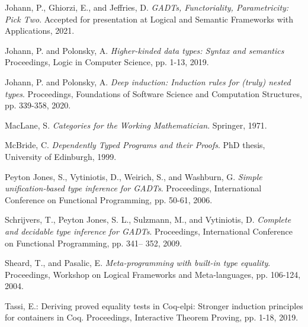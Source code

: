 \documentclass[9pt]{entcs}
\begin{document}
\begin{thebibliography}{10}
 Johann, P., Ghiorzi, E., and Jeffries, D. {\em GADTs,
  Functoriality, Parametricity: Pick Two}. Accepted for presentation
  at Logical and Semantic Frameworks with Applications, 2021.

 Johann, P. and Polonsky, A. {\em Higher-kinded data
  types: Syntax and semantics} Proceedings, Logic in Computer Science,
  pp. 1-13, 2019.

 Johann, P. and Polonsky, A. {\em Deep induction:
  Induction rules for (truly) nested types}.  Proceedings, Foundations
  of Software Science and Computation Structures, pp. 339-358, 2020.

 MacLane, S. {\em Categories for the Working
  Mathematician}. Springer, 1971.

 McBride, C. {\em Dependently Typed Programs and their
  Proofs}. PhD thesis, University of Edinburgh, 1999.




 Peyton Jones, S., Vytiniotis, D., Weirich, S., and
  Washburn, G. {\em Simple unification-based type inference for
    GADTs}. Proceedings, International Conference on Functional
  Programming, pp. 50-61, 2006. 


 Schrijvers, T., Peyton Jones, S. L., Sulzmann, M., and
  Vytiniotis, D. {\em Complete and decidable type inference for
    GADTs}. Proceedings, International Conference on Functional
  Programming, pp. 341– 352, 2009.

 Sheard, T., and Pasalic, E. {\em Meta-programming with
  built-in type equality}. Proceedings, Workshop on Logical Frameworks
  and Meta-languages, pp. 106-124, 2004. 

 Tassi, E.: Deriving proved equality tests in Coq-elpi:
  Stronger induction principles for containers in Coq. Proceedings,
  Interactive Theorem Proving, pp. 1-18, 2019.
  

\end{thebibliography}
\end{document}
